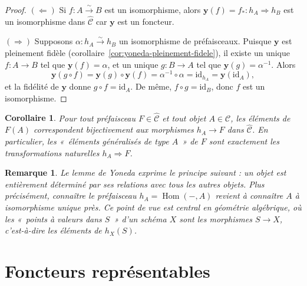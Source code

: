 \documentclass[a4paper,12pt]{book}
\DeclareMathOperator{\Hom}{Hom}
\newcommand{\id}{\mathrm{id}}
\newtheorem{corollaire}[theoreme]{Corollaire}
\newtheorem*{remarque}{Remarque}
\begin{document}
\begin{proof}
$(\Leftarrow)$ Si $f \colon A \xrightarrow{\sim} B$ est un isomorphisme,
alors $\mathbf{y}(f) = f_* \colon h_A \Rightarrow h_B$ est un isomorphisme
dans $\widehat{\mathcal{C}}$ car $\mathbf{y}$ est un foncteur.

$(\Rightarrow)$ Supposons $\alpha \colon h_A \xrightarrow{\sim} h_B$
un isomorphisme de préfaisceaux.
Puisque $\mathbf{y}$ est pleinement fidèle
(corollaire~\ref{cor:yoneda-pleinement-fidele}), il existe un unique
$f \colon A \to B$ tel que $\mathbf{y}(f) = \alpha$,
et un unique $g \colon B \to A$ tel que $\mathbf{y}(g) = \alpha^{-1}$.
Alors
\[
    \mathbf{y}(g \circ f) = \mathbf{y}(g) \circ \mathbf{y}(f)
    = \alpha^{-1} \circ \alpha = \id_{h_A} = \mathbf{y}(\id_A),
\]
et la fidélité de $\mathbf{y}$ donne $g \circ f = \id_A$.
De même, $f \circ g = \id_B$, donc $f$ est un isomorphisme.
\end{proof}

\begin{corollaire}\label{cor:yoneda-elements}
Pour tout préfaisceau $F \in \widehat{\mathcal{C}}$ et tout objet
$A \in \mathcal{C}$, les éléments de $F(A)$ correspondent
bijectivement aux morphismes $h_A \to F$ dans $\widehat{\mathcal{C}}$.
En particulier, les «~éléments généralisés de type $A$~» de $F$
sont exactement les transformations naturelles $h_A \Rightarrow F$.
\end{corollaire}

\begin{remarque}\label{rem:yoneda-philosophie}
Le lemme de Yoneda exprime le principe suivant : \emph{un objet est
entièrement déterminé par ses relations avec tous les autres objets}.
Plus précisément, connaître le préfaisceau $h_A = \Hom(-, A)$ revient
à connaître $A$ à isomorphisme unique près. Ce point de vue
est central en géométrie algébrique, où les «~points à valeurs dans $S$~»
d'un schéma $X$ sont les morphismes $S \to X$, c'est-à-dire les éléments
de $h_X(S)$.
\end{remarque}


\section{Foncteurs représentables}\label{sec:foncteurs-representables}
\end{document}
